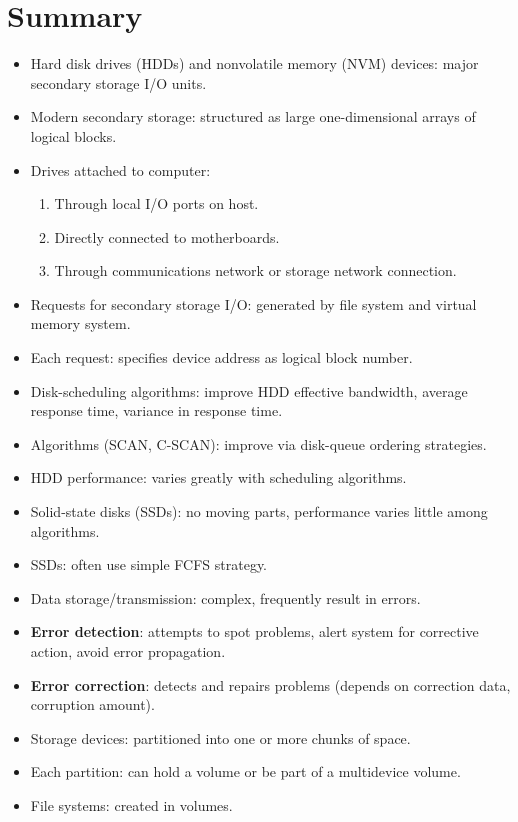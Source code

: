 \section{Summary}
\begin{itemize}
    \item Hard disk drives (HDDs) and nonvolatile memory (NVM) devices: major secondary storage I/O units.
    \item Modern secondary storage: structured as large one-dimensional arrays of logical blocks.
    \item Drives attached to computer:
    \begin{enumerate}
        \item Through local I/O ports on host.
        \item Directly connected to motherboards.
        \item Through communications network or storage network connection.
    \end{enumerate}
    \item Requests for secondary storage I/O: generated by file system and virtual memory system.
    \item Each request: specifies device address as logical block number.
    \item Disk-scheduling algorithms: improve HDD effective bandwidth, average response time, variance in response time.
    \item Algorithms (SCAN, C-SCAN): improve via disk-queue ordering strategies.
    \item HDD performance: varies greatly with scheduling algorithms.
    \item Solid-state disks (SSDs): no moving parts, performance varies little among algorithms.
    \item SSDs: often use simple FCFS strategy.
    \item Data storage/transmission: complex, frequently result in errors.
    \item \textbf{Error detection}: attempts to spot problems, alert system for corrective action, avoid error propagation.
    \item \textbf{Error correction}: detects and repairs problems (depends on correction data, corruption amount).
    \item Storage devices: partitioned into one or more chunks of space.
    \item Each partition: can hold a volume or be part of a multidevice volume.
    \item File systems: created in volumes.

\end{itemize}
